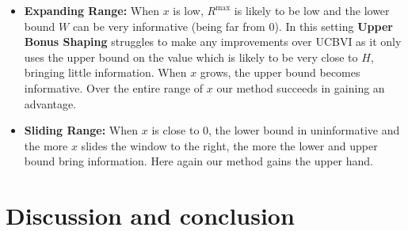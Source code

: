 \documentclass[twoside]{article}
\newcommand{\lowv}{W} %
\begin{document}



\begin{itemize}
    \item \textbf{Expanding Range:} When $x$ is low, $R^{\max}$ is likely to be low and the lower bound $\lowv$ can be very informative (being far from 0). In this setting \textbf{Upper Bonus Shaping} struggles to make any improvements over UCBVI as it only uses the upper bound on the value which is likely to be very close to $H$, bringing little information. When $x$ grows, the upper bound becomes informative. Over the entire range of $x$ our method succeeds in gaining an advantage.
    \item \textbf{Sliding Range:} When $x$ is close to 0, the lower bound in uninformative and the more $x$ slides the window to the right, the more the lower and upper bound bring information. Here again our method gains the upper hand.
\end{itemize}



\section{Discussion and conclusion}
\label{sec:discussion}
\end{document}
